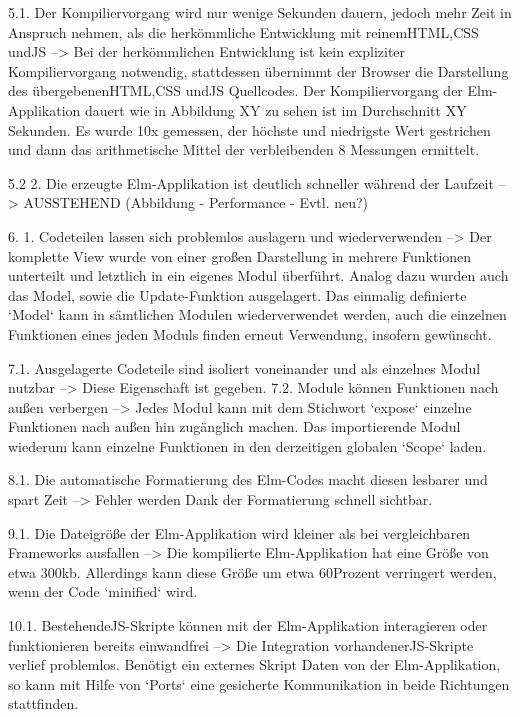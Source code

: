  5.1. Der Kompiliervorgang wird nur wenige Sekunden dauern, jedoch mehr Zeit in Anspruch nehmen, als die herkömmliche Entwicklung mit reinem\ac{HTML},\ac{CSS} und\ac{JS}
 --> Bei der herkömmlichen Entwicklung ist kein expliziter Kompiliervorgang notwendig, stattdessen übernimmt der Browser die Darstellung des übergebenen\ac{HTML},\ac{CSS} und\ac{JS} Quellcodes. Der Kompiliervorgang der Elm-Applikation dauert wie in Abbildung XY  zu sehen ist im Durchschnitt XY Sekunden. Es wurde 10x gemessen, der höchste und niedrigste Wert gestrichen und dann das arithmetische Mittel der verbleibenden 8 Messungen ermittelt.
 
 5.2  2. Die erzeugte Elm-Applikation ist deutlich schneller während der Laufzeit
 --> AUSSTEHEND (Abbildung - Performance - Evtl. neu?)
 
 6. 1. Codeteilen lassen sich problemlos auslagern und wiederverwenden
 --> Der komplette View wurde von einer großen Darstellung in mehrere Funktionen unterteilt und letztlich in ein eigenes Modul überführt. Analog dazu wurden auch das Model, sowie die Update-Funktion ausgelagert. Das einmalig definierte `Model` kann in sämtlichen Modulen wiederverwendet werden, auch die einzelnen Funktionen eines jeden Moduls finden erneut Verwendung, insofern gewünscht.
 
 7.1. Ausgelagerte Codeteile sind isoliert voneinander und als einzelnes Modul nutzbar
 --> Diese Eigenschaft ist gegeben.
 7.2. Module können Funktionen nach außen verbergen
 --> Jedes Modul kann mit dem Stichwort `expose` einzelne Funktionen nach außen hin zugänglich machen. Das importierende Modul wiederum kann einzelne Funktionen in den derzeitigen globalen `Scope` laden.
 
 8.1. Die automatische Formatierung des Elm-Codes macht diesen lesbarer und spart Zeit
 --> Fehler werden Dank der Formatierung schnell sichtbar.
 
 9.1. Die Dateigröße der Elm-Applikation wird kleiner als bei vergleichbaren Frameworks ausfallen
 --> Die kompilierte Elm-Applikation hat eine Größe von etwa 300kb. Allerdings kann diese Größe um etwa 60Prozent verringert werden, wenn der Code `minified` wird.
  
  10.1. Bestehende\ac{JS}-Skripte können mit der Elm-Applikation interagieren oder funktionieren bereits einwandfrei
  --> Die Integration vorhandener\ac{JS}-Skripte verlief problemlos. Benötigt ein externes Skript Daten von der Elm-Applikation, so kann mit Hilfe von `Ports` eine gesicherte Kommunikation in beide Richtungen stattfinden.
  
